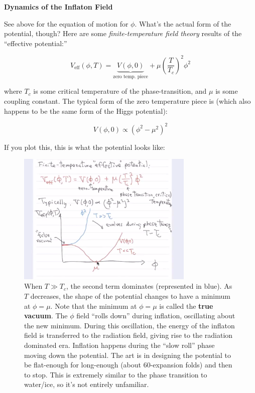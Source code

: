 \documentclass{article}
\newcommand{\be}{\begin{equation}}
\newcommand{\ee}{\end{equation}}
\begin{document}
\noindent\textbf{Dynamics of the Inflaton Field}

See above for the equation of motion for $\phi$. What's the actual form of the potential, though? Here are some \textit{finite-temperature field theory} results of the ``effective potential:''

\be
V_\text{eff}(\phi, T) = \underbrace{V(\phi, 0)}_\text{zero temp. piece} + \mu \left(\frac{T}{T_c}\right)^2 \phi^2
\ee

where $T_c$ is some critical temperature of the phase-transition, and $\mu$ is some coupling constant. The typical form of the zero temperature piece is (which also happens to be the same form of the Higgs potential):

\be
V(\phi,0) \propto \left(\phi^2 - \mu^2\right)^2
\ee

If you plot this, this is what the potential looks like:

\begin{figure}
    \centering
    \includegraphics[width=0.75\textwidth]{Screen Shot 2021-04-12 at 11.36.57 AM.png}
    \caption{When $T\gg T_c$, the second term dominates (represented in blue). As $T$ decreases, the shape of the potential changes to have a minimum at $\phi = \mu$. Note that the minimum at $\phi = \mu$ is called the \textbf{true vacuum}. The $\phi$ field ``rolls down'' during inflation, oscillating about the new minimum. During this oscillation, the energy of the inflaton field is transferred to the radiation field, giving rise to the radiation dominated era. Inflation happens during the ``slow roll'' phase moving down the potential. The art is in designing the potential to be flat-enough for long-enough (about 60-expansion folds) and then to stop. This is extremely similar to the phase transition to water/ice, so it's not entirely unfamiliar. }
    \label{fig:llllll}
\end{figure}
\end{document}
